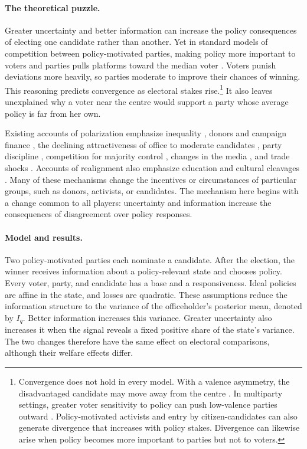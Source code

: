\documentclass[12pt,letterpaper]{article}
\begin{document}
\paragraph{The theoretical puzzle.}
Greater uncertainty and better information can increase the policy consequences of electing one candidate rather than another. Yet in standard models of competition between policy-motivated parties, making policy more important to voters and parties pulls platforms toward the median voter \citep{Wittman1983,Calvert1985,Roemer2001}. Voters punish deviations more heavily, so parties moderate to improve their chances of winning. This reasoning predicts convergence as electoral stakes rise.\footnote{Convergence does not hold in every model. With a valence asymmetry, the disadvantaged candidate may move away from the centre \citep{Groseclose2001}. In multiparty settings, greater voter sensitivity to policy can push low-valence parties outward \citep{Schofield2007}. Policy-motivated activists \citep{Aldrich1983} and entry by citizen-candidates \citep{OsborneSlivinski1996,BesleyCoate1997} can also generate divergence that increases with policy stakes. Divergence can likewise arise when policy becomes more important to parties but not to voters.} It also leaves unexplained why a voter near the centre would support a party whose average policy is far from her own.

Existing accounts of polarization emphasize inequality \citep{McCarty2016}, donors and campaign finance \citep{Bonica2014,LaRaja2015,Barber2016}, the declining attractiveness of office to moderate candidates \citep{Thomsen2017,Hall2019}, party discipline \citep{Canen2020}, competition for majority control \citep{Lee2016}, changes in the media \citep{Prior2007,MartinYurukoglu2017}, and trade shocks \citep{Autor2020}. Accounts of realignment also emphasize education and cultural cleavages \citep{Gethin2022}. Many of these mechanisms change the incentives or circumstances of particular groups, such as donors, activists, or candidates. The mechanism here begins with a change common to all players: uncertainty and information increase the consequences of disagreement over policy responses.

\paragraph{Model and results.}
Two policy-motivated parties each nominate a candidate. After the election, the winner receives information about a policy-relevant state and chooses policy. Every voter, party, and candidate has a base and a responsiveness. Ideal policies are affine in the state, and losses are quadratic. These assumptions reduce the information structure to the variance of the officeholder's posterior mean, denoted by $I_q$. Better information increases this variance. Greater uncertainty also increases it when the signal reveals a fixed positive share of the state's variance. The two changes therefore have the same effect on electoral comparisons, although their welfare effects differ.
\end{document}
